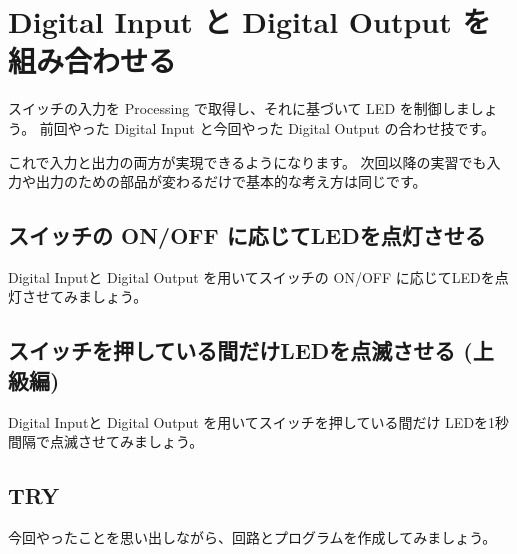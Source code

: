 \documentclass[11pt,a4paper]{jarticle}
\begin{document}
\section{Digital Input と Digital Output を組み合わせる}
スイッチの入力を Processing で取得し、それに基づいて LED を制御しましょう。
前回やった Digital Input と今回やった Digital Output の合わせ技です。

これで入力と出力の両方が実現できるようになります。
次回以降の実習でも入力や出力のための部品が変わるだけで基本的な考え方は同じです。

\subsection{スイッチの ON/OFF に応じてLEDを点灯させる}
Digital Inputと Digital Output を用いてスイッチの ON/OFF に応じてLEDを点灯させてみましょう。

\subsection{スイッチを押している間だけLEDを点滅させる (上級編) }
Digital Inputと Digital Output を用いてスイッチを押している間だけ LEDを1秒間隔で点滅させてみましょう。

\subsection*{TRY}
今回やったことを思い出しながら、回路とプログラムを作成してみましょう。
\end{document}
